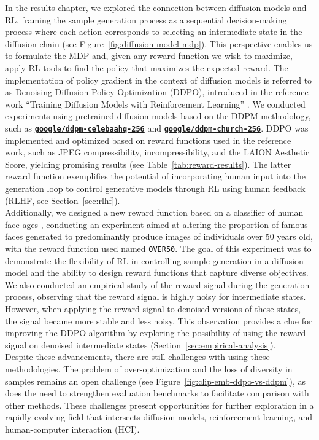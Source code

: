 \noindent In the results chapter, we explored the connection between diffusion models and RL, framing the sample generation process as a sequential decision-making process where each action corresponds to selecting an intermediate state in the diffusion chain (see Figure~\ref{fig:diffusion-model-mdp}). This perspective enables us to formulate the MDP and, given any reward function we wish to maximize, apply RL tools to find the policy that maximizes the expected reward. The implementation of policy gradient in the context of diffusion models is referred to as Denoising Diffusion Policy Optimization (DDPO), introduced in the reference work “Training Diffusion Models with Reinforcement Learning” \cite{black2023training}. We conducted experiments using pretrained diffusion models based on the DDPM methodology, such as \href{https://huggingface.co/google/ddpm-celebahq-256}{\textbf{\texttt{google/ddpm-celebaahq-256}}} and \href{https://huggingface.co/google/ddpm-church-256}{\textbf{\texttt{google/ddpm-church-256}}}. DDPO was implemented and optimized based on reward functions used in the reference work, such as JPEG compressibility, incompressibility, and the LAION Aesthetic Score, yielding promising results (see Table~\ref{tab:reward-results}). The latter reward function exemplifies the potential of incorporating human input into the generation loop to control generative models through RL using human feedback (RLHF, see Section~\ref{sec:rlhf}). \\

\noindent Additionally, we designed a new reward function based on a classifier of human face ages \cite{vitage-classifier-hf}, conducting an experiment aimed at altering the proportion of famous faces generated to predominantly produce images of individuals over 50 years old, with the reward function used named \texttt{OVER50}. The goal of this experiment was to demonstrate the flexibility of RL in controlling sample generation in a diffusion model and the ability to design reward functions that capture diverse objectives. \\

\noindent We also conducted an empirical study of the reward signal during the generation process, observing that the reward signal is highly noisy for intermediate states. However, when applying the reward signal to denoised versions of these states, the signal became more stable and less noisy. This observation provides a clue for improving the DDPO algorithm by exploring the possibility of using the reward signal on denoised intermediate states (Section~\ref{sec:empirical-analysis}). \\

\noindent Despite these advancements, there are still challenges with using these methodologies. The problem of over-optimization and the loss of diversity in samples remains an open challenge (see Figure~\ref{fig:clip-emb-ddpo-vs-ddpm}), as does the need to strengthen evaluation benchmarks to facilitate comparison with other methods. These challenges present opportunities for further exploration in a rapidly evolving field that intersects diffusion models, reinforcement learning, and human-computer interaction (HCI). \\